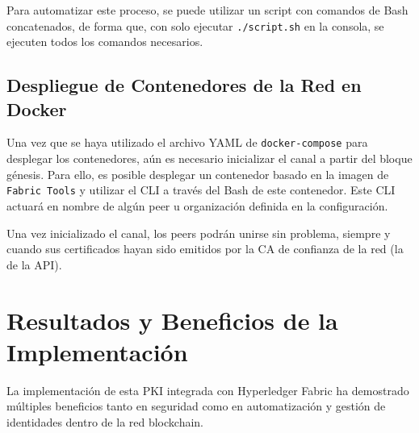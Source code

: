 Para automatizar este proceso, se puede utilizar un script con comandos de Bash concatenados, de forma que, con solo ejecutar \texttt{./script.sh} en la consola, se ejecuten todos los comandos necesarios.

\subsection{Despliegue de Contenedores de la Red en Docker}

Una vez que se haya utilizado el archivo YAML de \texttt{docker-compose} para desplegar los contenedores, aún es necesario inicializar el canal a partir del bloque génesis. Para ello, es posible desplegar un contenedor basado en la imagen de \texttt{Fabric Tools} y utilizar el CLI a través del Bash de este contenedor. Este CLI actuará en nombre de algún peer u organización definida en la configuración.

Una vez inicializado el canal, los peers podrán unirse sin problema, siempre y cuando sus certificados hayan sido emitidos por la CA de confianza de la red (la de la API).


\section{Resultados y Beneficios de la Implementación}

La implementación de esta PKI integrada con Hyperledger Fabric ha demostrado múltiples beneficios tanto en seguridad como en automatización y gestión de identidades dentro de la red blockchain.  

